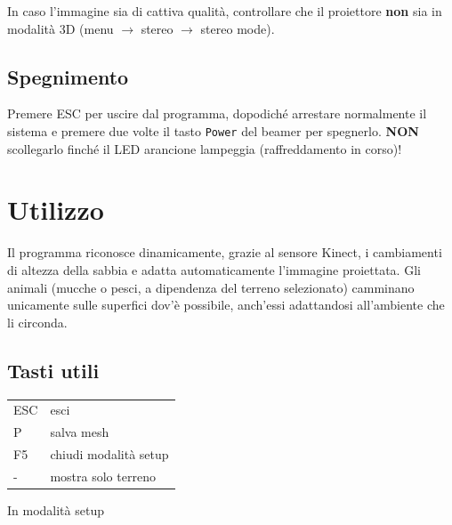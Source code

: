 \documentclass[12pt]{article}
\begin{document}
		In caso l'immagine sia di cattiva qualità, controllare
		che il proiettore \textbf{non} sia in modalità 3D (menu $\rightarrow$ stereo $\rightarrow$ stereo mode).\\


	\subsection{Spegnimento}
		
		Premere ESC per uscire dal programma, dopodiché arrestare normalmente il sistema e 
		premere due volte il tasto \texttt{Power} del beamer per spegnerlo. \textbf{NON} scollegarlo finché
		il LED arancione lampeggia (raffreddamento in corso)!
		
		
\section{Utilizzo}
		
	Il programma riconosce dinamicamente, grazie al sensore Kinect, i cambiamenti di altezza della sabbia
	e adatta automaticamente l'immagine proiettata. Gli animali (mucche o pesci, a dipendenza del terreno
	selezionato) camminano unicamente sulle superfici dov'è possibile, anch'essi adattandosi all'ambiente
	che li circonda.

	\subsection{Tasti utili}\label{sec:commands}
	
	\begin{tabular}{l l}
		ESC & esci\\
		P & salva mesh\\
		F5 & chiudi modalità setup\\
		- & mostra solo terreno\\
	\end{tabular}

	In modalità setup
\end{document}
